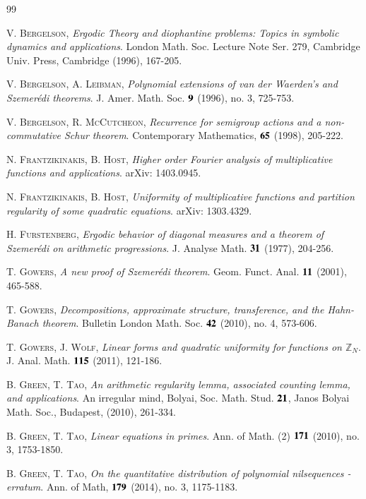 \documentclass[12pt,amstex]{amsart}
\theoremstyle{definition}
\begin{document}
\begin{thebibliography}{99}

\textsc{V. Bergelson}, \emph{Ergodic Theory and diophantine problems: Topics in symbolic dynamics and applications}. London Math. Soc. Lecture Note Ser. 279, Cambridge Univ. Press, Cambridge (1996), 167-205.

\textsc{V. Bergelson, A. Leibman}, \emph{Polynomial extensions of van der Waerden's and Szemer\'{e}di theorems}. J. Amer. Math. Soc. $\bold{9}$ (1996), no. 3, 725-753.

\textsc{V. Bergelson, R. McCutcheon}, \emph{Recurrence for semigroup actions and a non-commutative Schur theorem}. Contemporary Mathematics, $\bold{65}$ (1998), 205-222.

\textsc{N. Frantzikinakis, B. Host}, \emph{Higher order Fourier analysis of multiplicative functions and applications}. arXiv: 1403.0945.

\textsc{N. Frantzikinakis, B. Host}, \emph{Uniformity of multiplicative functions and partition regularity of some quadratic equations}. arXiv: 1303.4329.

\textsc{H. Furstenberg}, \emph{Ergodic behavior of diagonal measures and a theorem of Szemer\'{e}di on arithmetic
progressions}. J. Analyse Math. $\bold{31}$ (1977), 204-256.

\textsc{T. Gowers}, \emph{A new proof of Szemer\'{e}di theorem}. Geom. Funct. Anal. $\bold{11}$ (2001), 465-588.

\textsc{T. Gowers}, \emph{Decompositions, approximate structure, transference, and the Hahn-Banach theorem}. Bulletin London Math. Soc. $\bold{42}$ (2010), no. 4, 573-606.

\textsc{T. Gowers, J. Wolf}, \emph{Linear forms and quadratic uniformity for functions on $\mathbb{Z}_{N}$}. J. Anal. Math.
$\bold{115}$ (2011), 121-186.

\textsc{B. Green, T. Tao}, \emph{An arithmetic regularity lemma, associated counting lemma, and applications}. An irregular mind, Bolyai, Soc. Math. Stud. $\bold{21}$, Janos Bolyai Math. Soc., Budapest, (2010), 261-334.

\textsc{B. Green, T. Tao}, \emph{Linear equations in primes}. Ann. of Math. (2) $\bold{171}$ (2010), no. 3, 1753-1850.

\textsc{B. Green, T. Tao}, \emph{On the quantitative distribution of polynomial nilsequences - erratum}. Ann. of Math, $\bold{179}$ (2014), no. 3, 1175-1183.


\end{thebibliography}
\end{document}
